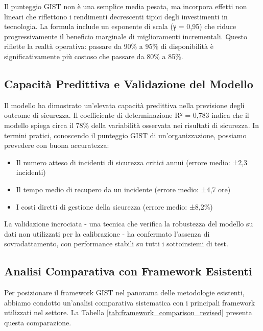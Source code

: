 \begin{tcolorbox}[
    colback=blue!5!white,
    colframe=blue!75!black,
    title={\textbf{Nota Metodologica:} Calcolo del Punteggio GIST},
    fonttitle=\bfseries
]
Il punteggio GIST non è una semplice media pesata, ma incorpora effetti non lineari che riflettono i rendimenti decrescenti tipici degli investimenti in tecnologia. La formula include un esponente di scala (γ = 0,95) che riduce progressivamente il beneficio marginale di miglioramenti incrementali. Questo riflette la realtà operativa: passare da 90\% a 95\% di disponibilità è significativamente più costoso che passare da 80\% a 85\%.
\end{tcolorbox}

\subsection{\texorpdfstring{\textbf{Capacità Predittiva e Validazione del Modello}}{5.3.2 - Capacità Predittiva e Validazione del Modello}}
\label{subsec:5.3.2}

Il modello ha dimostrato un'elevata capacità predittiva nella previsione degli outcome di sicurezza. Il coefficiente di determinazione R² = 0,783 indica che il modello spiega circa il 78\% della variabilità osservata nei risultati di sicurezza. In termini pratici, conoscendo il punteggio GIST di un'organizzazione, possiamo prevedere con buona accuratezza:
\begin{itemize}
\item Il numero atteso di incidenti di sicurezza critici annui (errore medio: ±2,3 incidenti)
\item Il tempo medio di recupero da un incidente (errore medio: ±4,7 ore)
\item I costi diretti di gestione della sicurezza (errore medio: ±8,2\%)
\end{itemize}

La validazione incrociata - una tecnica che verifica la robustezza del modello su dati non utilizzati per la calibrazione - ha confermato l'assenza di sovradattamento, con performance stabili su tutti i sottoinsiemi di test.

\subsection{\texorpdfstring{\textbf{Analisi Comparativa con Framework Esistenti}}{5.3.3 - Analisi Comparativa con Framework Esistenti}}
\label{subsec:5.3.3}

Per posizionare il framework GIST nel panorama delle metodologie esistenti, abbiamo condotto un'analisi comparativa sistematica con i principali framework utilizzati nel settore. La Tabella \ref{tab:framework_comparison_revised} presenta questa comparazione.

